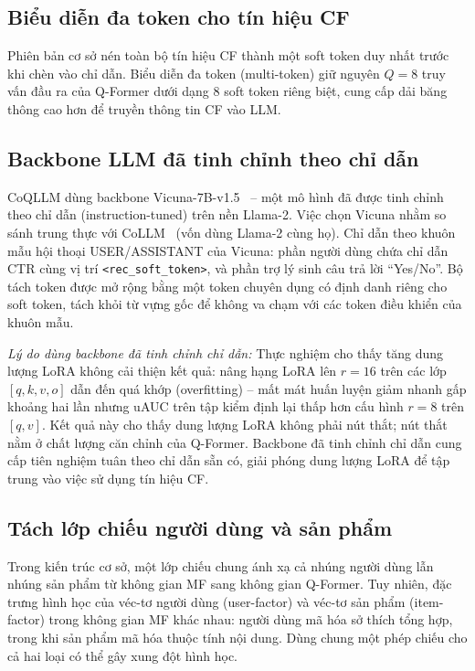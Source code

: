 \subsection{Biểu diễn đa token cho tín hiệu CF}
\label{ssec:da-token}

Phiên bản cơ sở nén toàn bộ tín hiệu CF thành một soft token duy nhất trước khi chèn vào
chỉ dẫn. Biểu diễn đa token (multi-token) giữ nguyên $Q = 8$ truy vấn đầu ra của Q-Former
dưới dạng $8$ soft token riêng biệt, cung cấp dải băng thông cao hơn để truyền thông tin
CF vào LLM.

\subsection{Backbone LLM đã tinh chỉnh theo chỉ dẫn}
\label{ssec:backbone-instruct}

CoQLLM dùng backbone Vicuna-7B-v1.5~\cite{vicuna2023} -- một mô hình đã được tinh chỉnh
theo chỉ dẫn (instruction-tuned) trên nền Llama-2. Việc chọn Vicuna nhằm so sánh trung
thực với CoLLM~\cite{collm2023} (vốn dùng Llama-2 cùng họ). Chỉ dẫn theo khuôn mẫu hội
thoại USER/ASSISTANT của Vicuna: phần người dùng chứa chỉ dẫn CTR cùng vị trí
\verb|<rec_soft_token>|, và phần trợ lý sinh câu trả lời ``Yes/No''. Bộ tách token được
mở rộng bằng một token chuyên dụng có định danh riêng cho soft token, tách khỏi từ vựng
gốc để không va chạm với các token điều khiển của khuôn mẫu.

\textit{Lý do dùng backbone đã tinh chỉnh chỉ dẫn:} Thực nghiệm cho thấy tăng dung lượng
LoRA không cải thiện kết quả: nâng hạng LoRA lên $r = 16$ trên các lớp $[q,k,v,o]$ dẫn
đến quá khớp (overfitting) -- mất mát huấn luyện giảm nhanh gấp khoảng hai lần nhưng uAUC
trên tập kiểm định lại thấp hơn cấu hình $r = 8$ trên $[q,v]$. Kết quả này cho thấy dung
lượng LoRA không phải nút thắt; nút thắt nằm ở chất lượng căn chỉnh của Q-Former. Backbone
đã tinh chỉnh chỉ dẫn cung cấp tiên nghiệm tuân theo chỉ dẫn sẵn có, giải phóng dung lượng
LoRA để tập trung vào việc sử dụng tín hiệu CF.

\subsection{Tách lớp chiếu người dùng và sản phẩm}
\label{ssec:tach-projector}

Trong kiến trúc cơ sở, một lớp chiếu chung ánh xạ cả nhúng người dùng lẫn nhúng sản
phẩm từ không gian MF sang không gian Q-Former. Tuy nhiên, đặc trưng hình học của
véc-tơ người dùng (user-factor) và véc-tơ sản phẩm (item-factor) trong không gian MF
khác nhau: người dùng mã hóa sở thích tổng hợp, trong khi sản phẩm mã hóa thuộc tính
nội dung. Dùng chung một phép chiếu cho cả hai loại có thể gây xung đột hình học.

